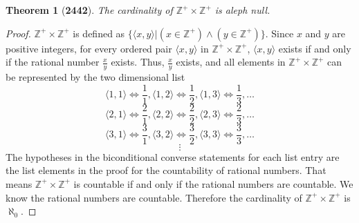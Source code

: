\documentclass[preview]{standalone}
\newtheorem{theorem}{Theorem}
\begin{document}
\begin{theorem}[\textbf{2442}]
    The cardinality of $\mathbb{Z^{+}} \times \mathbb{Z^{+}}$ is aleph null.
\end{theorem}

\begin{proof}
    $\mathbb{Z^{+}} \times \mathbb{Z^{+}}$ is defined as 
    $\{ \langle x, y \rangle | (x \in \mathbb{Z^{+}}) \land (y \in \mathbb{Z^{+}})\}$. 
    Since $x$ and $y$ are positive integers, for every ordered pair $\langle x, y \rangle$ in 
    $\mathbb{Z^{+}} \times \mathbb{Z^{+}}$, $\langle x, y \rangle$ exists if and only if the rational number 
    $\frac{x}{y}$ exists. Thus, $\frac{x}{y}$ exists, and all elements in 
    $\mathbb{Z^{+}} \times \mathbb{Z^{+}}$ can be represented by the two dimensional list
    $$\langle 1,1 \rangle \iff \frac{1}{1}, \langle 1,2 \rangle \iff \frac{1}{2}, \langle 1,3 \rangle \iff \frac{1}{3}, \dots$$
    $$\langle 2,1 \rangle \iff \frac{2}{1}, \langle 2,2 \rangle \iff \frac{2}{2}, \langle 2,3 \rangle \iff \frac{2}{3}, \dots$$
    $$\langle 3,1 \rangle \iff \frac{3}{1}, \langle 3,2 \rangle \iff \frac{3}{2}, \langle 3,3 \rangle \iff \frac{3}{3}, \dots$$
    $$\vdots$$
    The hypotheses in the biconditional converse statements for each list entry are the list 
    elements in the proof for the countability of rational numbers. That means 
    $\mathbb{Z^{+}} \times \mathbb{Z^{+}}$ is countable if and only if the rational numbers are 
    countable. We know the rational numbers are countable. Therefore the cardinality of 
    $\mathbb{Z^{+}} \times \mathbb{Z^{+}}$ is $\aleph_0$.
\end{proof}
\end{document}
